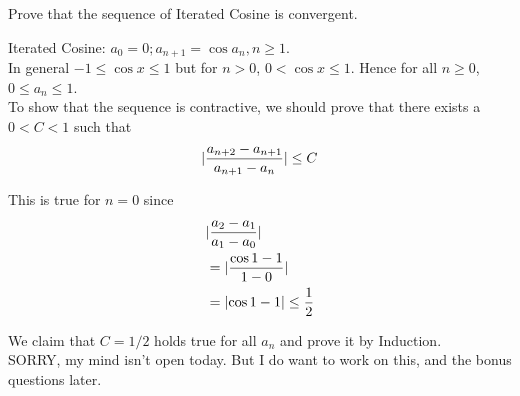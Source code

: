 \documentclass[boxes, qed]{homework}
\DeclarePairedDelimiter\abs{\lvert}{\rvert}%
\begin{document}
\begin{problem}Prove that the sequence of
  Iterated Cosine is convergent.
\end{problem}
\begin{solution}Iterated Cosine: $a_0=0; a_{n+1}=\cos{a_n}, n\ge{1}$.\\
  In general $-1\le\cos{x}\le{1}$ but for $n>0$, $0<\cos{x}\le{1}$.
  Hence for all $n\ge{0}$, $0 \le a_n \le 1$.\\

  To show that the sequence is contractive, we should prove that there
  exists a $0<C<1$ such that
  $$\abs{\frac{a_{n+2}-a_{n+1}}{a_{n+1}-a_n}}\le{C}$$
  
  This is true for $n=0$ since
  \begin{align*}
    & \abs{\frac{a_2-a_1}{a_1-a_0}}\\
    &= \abs{\frac{\cos{1}-1}{1-0}}\\
    &= \abs{\cos{1}-1} \le \frac{1}{2}
  \end{align*}

  We claim that $C=1/2$ holds true for all $a_n$
  and prove it by Induction.\\

  SORRY, my mind isn't open today. But I do 
  want to work on this, and the bonus questions
  later.
\end{solution}
\end{document}
